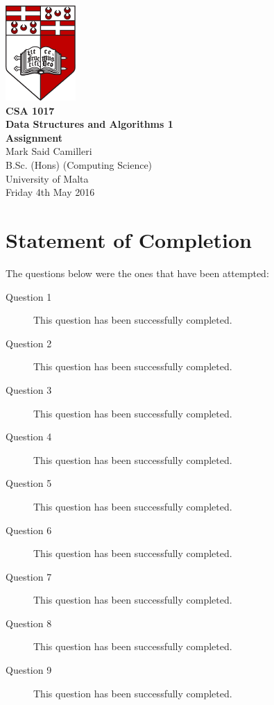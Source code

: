 \documentclass[12pt,a4paper,onesided]{report}
\begin{document}
	\begin{titlepage}
		\vspace*{\fill}
\centering
\includegraphics[width=0.2\textwidth]{University_of_Malta_Logo}\\
\vspace*{3em}
\textbf{\LARGE CSA 1017\\\vspace{0.1em}Data Structures and Algorithms 1}\\
\vspace*{0.75em}
\textbf{\Large Assignment}\\
\vspace{3em}
\large Mark Said Camilleri\\
B.Sc. (Hons) (Computing Science)\\
University of Malta\\
\vspace*{1em}
Friday 4th May 2016
\vfill
\end{titlepage}
\pagebreak
\tableofcontents
{}

\chapter*{Statement of Completion}
The questions below were the ones that have been attempted:
	\begin{description}
		\item[Question 1]This question has been successfully completed.
		\item[Question 2]This question has been successfully completed.
		\item[Question 3]This question has been successfully completed.
		\item[Question 4]This question has been successfully completed.
		\item[Question 5]This question has been successfully completed.
		\item[Question 6]This question has been successfully completed.
		\item[Question 7]This question has been successfully completed.
		\item[Question 8]This question has been successfully completed.
		\item[Question 9]This question has been successfully completed.
	\end{description}
\end{document}
